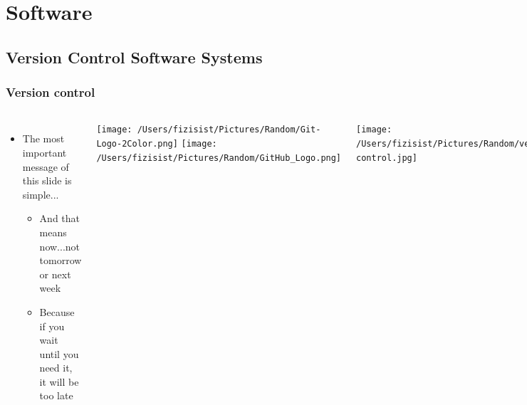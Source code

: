 \documentclass[hyperref={colorlinks=true}]{beamer}
\begin{document}
\section[Software]{Software}

\subsection[Version Control Software Systems]{Version Control Software Systems}

\begin{frame}%
  \frametitle{Version control}
  
  \begin{columns}
  
    
      \begin{itemize}
        \item The most important message of this slide is simple...
        \begin{itemize}
          \item And that means now...not tomorrow or next week
          \item Because if you wait until you need it, it will be too late
        \end{itemize}
      \end{itemize}
      
      \pause
      
      \centering
      
      \texttt{[image: /Users/fizisist/Pictures/Random/Git-Logo-2Color.png]}
      \texttt{[image: /Users/fizisist/Pictures/Random/GitHub\_Logo.png]}
    
    
      \texttt{[image: /Users/fizisist/Pictures/Random/version-control.jpg]}
  
  \end{columns}

\end{frame}

\end{document}
